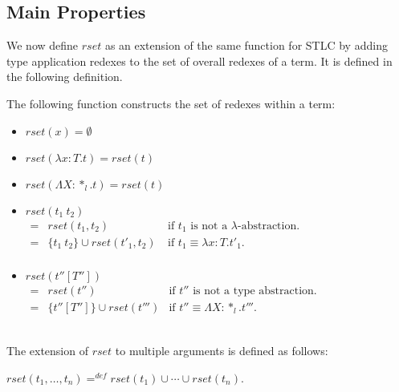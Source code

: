 \subsection{Main Properties}
\label{sec:properties_of_the_hereditary_substitution_function_ssf}
We now define $rset$ as an extension of the same function for STLC by
adding type application redexes to the set of overall redexes
of a term.  It is defined in the following definition.  
\begin{definition}
  \label{def:rset_ssf}
  The following function constructs the set of redexes within a term:
  \begin{center}
    \begin{itemize}
    \item[] $rset(x) = \emptyset$\\
    \item[] $rset(\lambda x:T.t) = rset(t)$\\
    \item[] $rset(\Lambda X:*_l.t) = rset(t)$\\
    \item[] $rset(t_1\ t_2)$\\
      \begin{math}
        \begin{array}{lll}
          = & rset(t_1, t_2) & \text{if } t_1 \text{ is not a } \lambda \text{-abstraction.}\\
          = & \{t_1\ t_2\} \cup rset(t'_1, t_2)\ & \text{if } t_1 \equiv \lambda x:T.t'_1.\\
        \end{array}
      \end{math}
    \item[] $rset(t''[T''])$\\
      \begin{math}
        \begin{array}{lll}
          = & rset(t'') & \text{if } t'' \text{ is not a type abstraction.}\\
          = & \{t''[T'']\} \cup rset(t''') & \text{if } t'' \equiv \Lambda X:*_l.t'''.
        \end{array}
      \end{math}
    \end{itemize}
  \end{center}
  \ \\
  The extension of $rset$ to multiple arguments is defined as follows:
  \begin{center}
    $rset(t_1, \ldots, t_n) =^{def} rset(t_1) \cup \cdots \cup rset(t_n)$.
  \end{center}
\end{definition}
